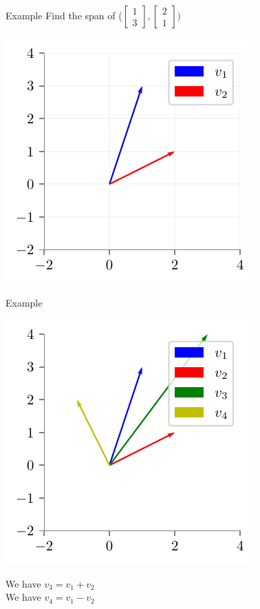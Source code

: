 \documentclass{beamer}
\begin{document}
\begin{frame}{Example}
Find the span of ($\begin{bmatrix}
1 \\3
\end{bmatrix}, \begin{bmatrix}
2 \\1
\end{bmatrix}) $

\includegraphics{../figures/linear-regression/geoemetric-span-1.pdf}



\end{frame}

\begin{frame}{Example}

    \includegraphics{../figures/linear-regression/geoemetric-span-2.pdf}

    We have $v_3 = v_1 + v_2$ \\
    We have $v_4 = v_1 - v_2$ \\


\end{frame}
\end{document}
